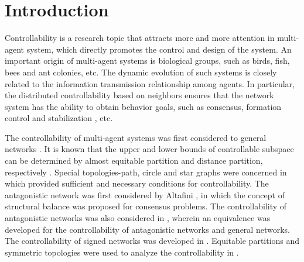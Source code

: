 \documentclass[a4paper,11pt]{article}
\begin{document}
\section{Introduction}
Controllability is a research topic that attracts more and more attention in multi-agent system, which directly promotes the control and design of the system. An important origin of multi-agent systems is biological groups, such as birds, fish, bees and ant colonies, etc. The dynamic evolution of such systems is closely related to the information transmission relationship among agents. In particular, the distributed controllability based on neighbors ensures that the network system has the ability to obtain behavior goals, such as consensus, formation control and stabilization \cite{newcyb,conliu1,consensusliu,fc,stab2}, etc.

The controllability of multi-agent systems was first considered to general networks \cite{tanner}. It is known that the upper and lower bounds of controllable subspace can be determined by almost equitable partition and distance partition, respectively \cite{cesar,distance,zhangshuo}. Special topologies-path, circle and star graphs were concerned in \cite{pc,cao} which provided sufficient and necessary conditions for controllability. The antagonistic network was first considered by Altafini \cite{biconsensus}, in which the concept of structural balance was proposed for consensus problems. The controllability of antagonistic networks was also considered in \cite{sun}, wherein an equivalence was developed for the controllability of antagonistic networks and general networks. The controllability of signed networks was developed in \cite{signed1,signed2,signed3,signed4}. Equitable partitions and symmetric topologies were used to analyze the controllability in \cite{jimeng}.
\end{document}
